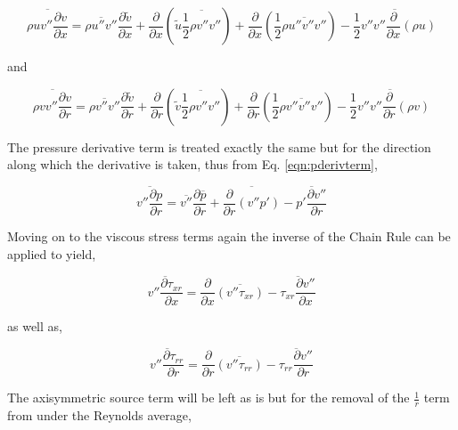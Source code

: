 \begin{equation}
	\overline{\rho u v'' \frac{\partial v}{\partial x}} = \overline{\rho u'' v''}\frac{\partial \tilde v}{\partial x}
	+ \frac{\partial}{\partial x}(\tilde u \overline{\frac{1}{2}\rho v'' v''}) + \frac{\partial}{\partial x}(\frac{1}{2}
	\overline{\rho u'' v'' v''})- \overline{\frac{1}{2}v''v''\frac{\partial}{\partial x}(\rho u)}
\label{eqn:xderivterm2}
\end{equation}

	and

\begin{equation}
	\overline{\rho v v'' \frac{\partial v}{\partial r}} = \overline{\rho v'' v''}\frac{\partial \tilde v}{\partial r}
	+ \frac{\partial}{\partial r}(\tilde v \overline{\frac{1}{2}\rho v'' v''}) + \frac{\partial}{\partial r}(\frac{1}{2}
	\overline{\rho v'' v'' v''})- \overline{\frac{1}{2}v''v''\frac{\partial}{\partial r}(\rho v)}
\label{eqn:rderivterm2}
\end{equation}

	The pressure derivative term is treated exactly the same but for the direction along which the derivative is taken,
thus from Eq. \ref{eqn:pderivterm},

\begin{equation}
	\overline{v''\frac{\partial p}{\partial r}} = \overline{v''}\frac{\partial \overline{p}}{\partial r} 
	+ \overline{\frac{\partial}{\partial r}(v''p')} - \overline {p'\frac{\partial v''}{\partial r}}
\label{eqn:pderivterm2}
\end{equation}

	Moving on to the viscous stress terms again the inverse of the Chain Rule can be applied to yield,

\begin{equation}
	\overline{v''\frac{\partial \tau_{xr}}{\partial x}} = \frac{\partial}{\partial x}\overline{(v''\tau_{xr})} -
	\overline{\tau_{xr}\frac{\partial v''}{\partial x}}
\label{eqn:tauxrterm}
\end{equation}
	
	as well as,

\begin{equation}
	\overline{v''\frac{\partial \tau_{rr}}{\partial r}} = \frac{\partial}{\partial r}\overline{(v''\tau_{rr})} -
	\overline{\tau_{rr}\frac{\partial v''}{\partial r}}
\label{eqn:taurrterm}
\end{equation}

	The axisymmetric source term will be left as is but for the removal of the $\frac{1}{r}$ term from 
under the Reynolds average,

